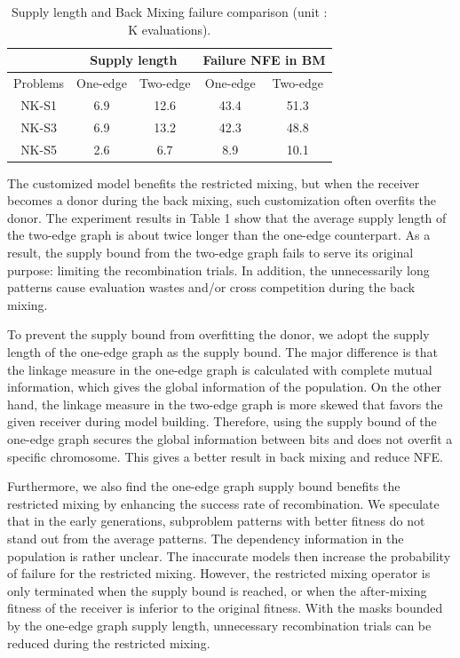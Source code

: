 \begin{table}[t!]
\begin{tabular}{|c|c|c|c|c|}
\hline
 &
\multicolumn{2}{c|}{Supply length} &
\multicolumn{2}{c|}{Failure NFE in BM} \\
\hline
Problems  & One-edge & Two-edge & One-edge & Two-edge \\\hline
NK-S1 &  6.9 &12.6  &43.4 & 51.3 \\\hline
NK-S3 & 6.9  & 13.2  &42.3 & 48.8 \\\hline
NK-S5 & 2.6  &6.7  &  8.9& 10.1 \\\hline

\end{tabular}
\caption{Supply length and Back Mixing failure comparison (unit : K evaluations).}
\end{table}


The customized model benefits the restricted mixing, but when the receiver becomes a donor during the back mixing, such customization often overfits the donor. The experiment results in Table 1 show that the average supply length of the two-edge graph is about twice longer than the one-edge counterpart. As a result, the supply bound from the two-edge graph fails to serve its original purpose: limiting the recombination trials. In addition, the unnecessarily long patterns cause evaluation wastes and/or cross competition during the back mixing. 


To prevent the supply bound from overfitting the donor, we adopt the supply length of the one-edge graph as the supply bound. The major difference is that the linkage measure in the one-edge graph is calculated with complete mutual information, which gives the global information of the population. On the other hand, the linkage measure in the two-edge graph is more skewed that favors the given receiver during model building. Therefore, using the supply bound of the one-edge graph secures the global information between bits and does not overfit a specific chromosome. This gives a better result in back mixing and reduce NFE.


Furthermore, we also find the one-edge graph supply bound benefits the restricted mixing by enhancing the success rate of recombination. We speculate that in the early generations, subproblem patterns with better fitness do not stand out from the average patterns. The dependency information in the population is rather unclear. The inaccurate models then increase the probability of failure for the restricted mixing. However, the restricted mixing operator is only terminated when the supply bound is reached, or when the after-mixing fitness of the receiver is inferior to the original fitness. With the masks bounded by the one-edge graph supply length, unnecessary recombination trials can be reduced during the restricted mixing. 


